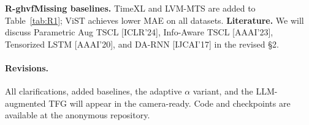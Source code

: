 \documentclass[9pt,twocolumn,letterpaper]{article}
\newcommand{\Rghvf}{\vspace{0.0em}\noindent \textcolor[RGB]{128, 0, 128}{\textbf{R-ghvf}\hspace{0.2em}}}
\begin{document}
\Rghvf \textbf{Missing baselines.} TimeXL and LVM-MTS are added to Table~\ref{tab:R1}; ViST achieves lower MAE on all datasets. \textbf{Literature.} We will discuss Parametric Aug TSCL [ICLR'24], Info-Aware TSCL [AAAI'23], Tensorized LSTM [AAAI'20], and DA-RNN [IJCAI'17] in the revised \S2.

\vspace{-0.3em}
\paragraph{Revisions.} All clarifications, added baselines, the adaptive $\alpha$ variant, and the LLM-augmented TFG will appear in the camera-ready. Code and checkpoints are available at the anonymous repository.
\end{document}
